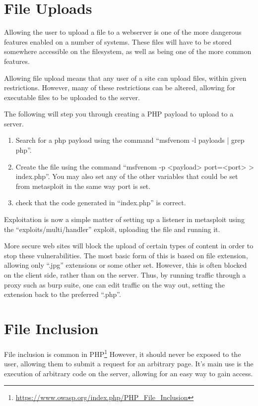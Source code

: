 	\section{File Uploads}
		Allowing the user to upload a file to a webserver is one of the more dangerous features enabled on a number of systems. 
		These files will have to be stored somewhere accessible on the filesystem, as well as being one of the more common features. 

		Allowing file upload means that any user of a site can upload files, within given restrictions. 
		However, many of these restrictions can be altered, allowing for executable files to be uploaded to the server. 

		The following will step you through creating a PHP payload to upload to a server. 
		\begin{enumerate}
			\item Search for a php payload using the command ``msfvenom -l payloads | grep php''. 
			\item Create the file using the command ``msfvenom -p <payload> port=<port> > index.php''.
				You may also set any of the other variables that could be set from metasploit in the same way port is set.
			\item check that the code generated in ``index.php'' is correct. 
		\end{enumerate}

		Exploitation is now a simple matter of setting up a listener in metasploit using the ``exploits/multi/handler'' exploit, uploading the file and running it.

		More secure web sites will block the upload of certain types of content in order to stop these vulnerabilities. 
		The most basic form of this is based on file extension, allowing only ``.jpg'' extensions or some other set. 
		However, this is often blocked on the client side, rather than on the server. 
		Thus, by running traffic through a proxy such as burp suite, 
		one can edit traffic on the way out, setting the extension back to the preferred ``.php''. 
	\section{File Inclusion}
		File inclusion is common in PHP\footnote{\url{https://www.owasp.org/index.php/PHP\_File\_Inclusion}}
		However, it should never be exposed to the user, allowing them to submit a request for an arbitrary page. 
		It's main use is the execution of arbitrary code on the server, allowing for an easy way to gain access. 

